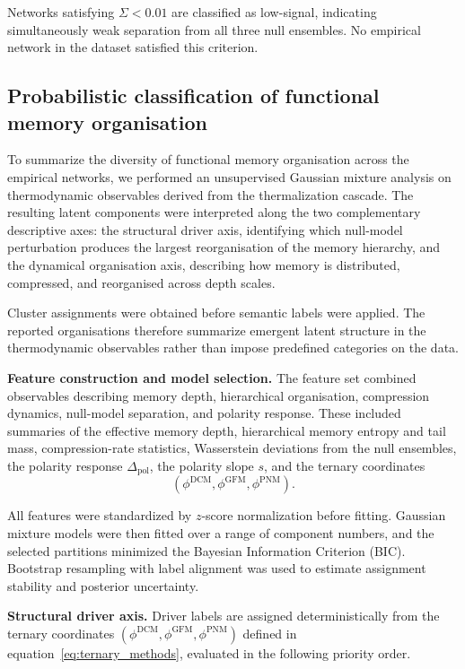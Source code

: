 \documentclass[aps,superscriptaddress,11pt]{revtex4-2}
\theoremstyle{definition}
\theoremstyle{plain}
\begin{document}
Networks satisfying $\Sigma<0.01$ are classified as low-signal, indicating simultaneously weak separation
from all three null ensembles. No empirical network in the dataset
satisfied this criterion.

\subsection{Probabilistic classification of functional memory organisation}
\label{sec:classification}

To summarize the diversity of functional memory organisation across the
empirical networks, we performed an unsupervised Gaussian mixture analysis
on thermodynamic observables derived from the thermalization cascade. The
resulting latent components were interpreted along the two complementary
descriptive axes: the structural driver axis, identifying which null-model
perturbation produces the largest reorganisation of the memory hierarchy,
and the dynamical organisation axis, describing how memory is distributed,
compressed, and reorganised across depth scales.

Cluster assignments were obtained before semantic labels were applied. The
reported organisations therefore summarize emergent latent structure in the
thermodynamic observables rather than impose predefined categories on the
data.

\medskip
\noindent\textbf{Feature construction and model selection.}
The feature set combined observables describing memory depth, hierarchical
organisation, compression dynamics, null-model separation, and polarity
response. These included summaries of the effective memory depth,
hierarchical memory entropy and tail mass, compression-rate statistics,
Wasserstein deviations from the null ensembles, the polarity response
$\Delta_{\mathrm{pol}}$, the polarity slope $s$, and the ternary
coordinates
\[
(\phi^{\mathrm{DCM}},
 \phi^{\mathrm{GFM}},
 \phi^{\mathrm{PNM}}).
\]

All features were standardized by $z$-score normalization before fitting.
Gaussian mixture models were then fitted over a range of component numbers,
and the selected partitions minimized the Bayesian Information Criterion
(BIC). Bootstrap resampling with label alignment was used to estimate
assignment stability and posterior uncertainty.

\medskip
\noindent\textbf{Structural driver axis.}
Driver labels are assigned deterministically from the ternary coordinates
$(\phi^{\mathrm{DCM}}, \phi^{\mathrm{GFM}}, \phi^{\mathrm{PNM}})$
defined in equation~\eqref{eq:ternary_methods}, evaluated in the
following priority order.
\end{document}
